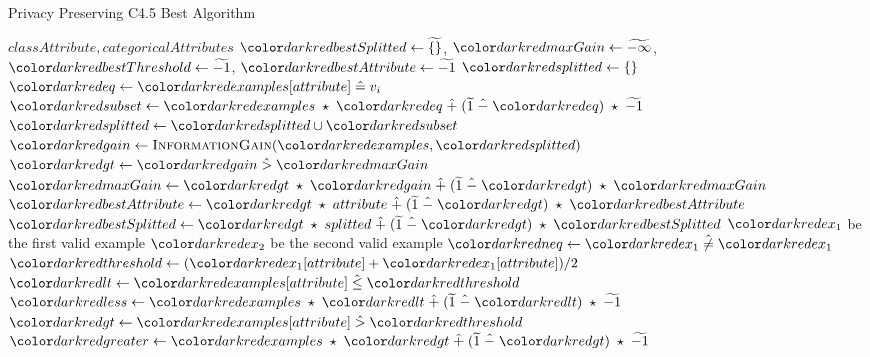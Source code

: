 \begin{algorithm}[H]
\caption{Privacy Preserving C4.5 Best Algorithm}\label{a:c45-best-pp}
\begin{algorithmic}[1]
\renewcommand{\algorithmicrequire}{\textbf{Global Vars:}}
\Require $classAttribute, categoricalAttributes$
  \State $\red{bestSplitted} \gets \enc{\{\}}$,  $\red{maxGain} \gets \enc{-\infty}$, $\red{bestThreshold} \gets \enc{-1}$, $\red{bestAttribute} \gets \enc{-1}$
      \State $\red{splitted} \gets \{\}$
        \State $\red{eq} \gets \red{examples}[attribute] \heq v_i$ 
        \State $\red{subset} \gets \red{examples} \hmul \red{eq} \hplus (\enc{1} \hminus \red{eq}) \hmul \enc{-1} $ 
          \State $\red{splitted} \gets \red{splitted} \cup \red{subset}$
        \EndFor
        \State $\red{gain} \gets  \textsc{InformationGain}(\red{examples}, \red{splitted})$
        \State $\red{gt} \gets \red{gain} \hgt  \red{maxGain}$
        \State $\red{maxGain} \gets \red{gt} \hmul \red{gain} \hplus (\enc{1} \hminus \red{gt}) \hmul \red{maxGain}$ 
        \State $\red{bestAttribute} \gets \red{gt} \hmul attribute \hplus (\enc{1} \hminus \red{gt}) \hmul \red{bestAttribute}$
        \State $\red{bestSplitted} \gets \red{gt} \hmul splitted \hplus (\enc{1} \hminus \red{gt}) \hmul \red{bestSplitted}$
    \Else {}
           $\red{ex_1}$ {\small be the first valid example}
           $\red{ex_2}$ {\small be the second valid example}
          \State $\red{neq} \gets \red{ex_1} \hneq \red{ex_1}$
          \State $\red{threshold} \gets (\red{ex_1}[attribute] + \red{ex_1}[attribute]) / 2$
          \State $\red{lt} \gets \red{examples}[attribute] \hlte \red{threshold}$ 
          \State $\red{less} \gets \red{examples} \hmul \red{lt} \hplus (\enc{1} \hminus \red{lt}) \hmul \enc{-1} $ 
          \State $\red{gt} \gets \red{examples}[attribute] \hgt \red{threshold}$
          \State $\red{greater} \gets \red{examples} \hmul \red{gt} \hplus (\enc{1} \hminus \red{gt}) \hmul \enc{-1} $


\end{algorithmic}
\end{algorithm}
